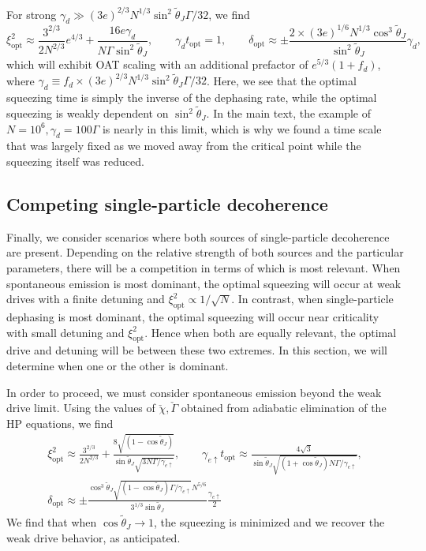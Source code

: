 For strong $\gamma_d \gg (3 e)^{2/3} N^{1/3} \sin^2 \tilde{\theta}_J \Gamma/32$, we find
\begin{equation}
    \xi^2_{\text{opt}} \approx \frac{3^{2/3} }{2 N^{2/3}} e^{4/3} + \frac{16 e \gamma_d}{N \Gamma \sin^2 \tilde{\theta}_J} , \qquad \gamma_d t_{\text{opt}} = 1, \qquad \delta_{\text{opt}} \approx \pm \frac{2 \times (3 e)^{1/6} N^{1/3} \cos^3 \tilde{\theta}_J }{\sin^2 \tilde{\theta}_J} \gamma_d,
\end{equation}
which will exhibit OAT scaling with an additional prefactor of $e^{5/3}(1+f_d)$, where $\gamma_d \equiv f_d \times (3 e)^{2/3} N^{1/3} \sin^2 \tilde{\theta}_J \Gamma/32$. Here, we see that the optimal squeezing time is simply the inverse of the dephasing rate, while the optimal squeezing is weakly dependent on $\sin^2 \tilde{\theta}_J$. In the main text, the example of $N= 10^6, \gamma_d = 100 \Gamma$ is nearly in this limit, which is why we found a time scale that was largely fixed as we moved away from the critical point while the squeezing itself was reduced. 
 
\subsection{Competing single-particle decoherence}

Finally, we consider scenarios where both sources of single-particle decoherence are present. Depending on the relative strength of both sources and the particular parameters, there will be a competition in terms of which is most relevant. When spontaneous emission is most dominant, the optimal squeezing will occur at weak drives with a finite detuning and $\xi^2_{\text{opt}} \propto 1/\sqrt{N}$. In contrast, when single-particle dephasing is most dominant, the optimal squeezing will occur near criticality with small detuning and $\xi^2_{\text{opt}}$. Hence when both are equally relevant, the optimal drive and detuning will be between these two extremes. In this section, we will determine when one or the other is dominant. 

In order to proceed, we must consider spontaneous emission beyond the weak drive limit. Using the values of $\check \chi, \check \Gamma$ obtained from adiabatic elimination of the HP equations, we find
\begin{equation}
\begin{gathered}
    \xi^2_{\text{opt}} \approx \frac{3^{2/3}}{2 N^{2/3}} + \frac{8 \sqrt{(1-\cos \tilde{\theta}_J)}}{\sin \tilde{\theta}_J \sqrt{3 N \Gamma /\gamma_{e \uparrow}} }, \qquad \gamma_{e \uparrow} t_{\text{opt}} \approx \frac{4 \sqrt{3}}{  \sin \tilde{\theta}_J \sqrt{ (1+\cos \tilde{\theta}_J) N  \Gamma / \gamma_{e \uparrow}}}, \\
    \delta_{\text{opt}} \approx \pm \frac{\cos^3 \tilde{\theta}_J \sqrt{(1- \cos \tilde{\theta}_J)  \Gamma/ \gamma_{e \uparrow}} N^{5/6}}{3^{1/3} \sin \tilde{\theta}_J} \frac{\gamma_{e \uparrow}}{2}
\end{gathered}
\end{equation}
We find that when $\cos \tilde{\theta}_J \to 1$, the squeezing is minimized and we recover the weak drive behavior, as anticipated. 

